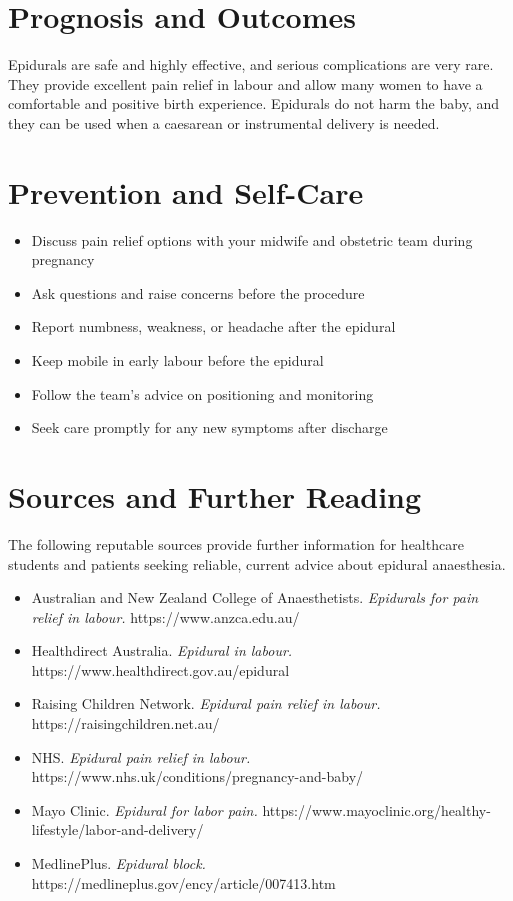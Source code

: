 \section*{Prognosis and Outcomes}
Epidurals are safe and highly effective, and serious complications are very rare. They provide excellent pain relief in labour and allow many women to have a comfortable and positive birth experience. Epidurals do not harm the baby, and they can be used when a caesarean or instrumental delivery is needed.

\section*{Prevention and Self-Care}
\begin{itemize}
    \item Discuss pain relief options with your midwife and obstetric team during pregnancy
    \item Ask questions and raise concerns before the procedure
    \item Report numbness, weakness, or headache after the epidural
    \item Keep mobile in early labour before the epidural
    \item Follow the team's advice on positioning and monitoring
    \item Seek care promptly for any new symptoms after discharge
\end{itemize}

\section*{Sources and Further Reading}
The following reputable sources provide further information for healthcare students and patients seeking reliable, current advice about epidural anaesthesia.
\begin{itemize}
    \item Australian and New Zealand College of Anaesthetists. \textit{Epidurals for pain relief in labour.} https://www.anzca.edu.au/
    \item Healthdirect Australia. \textit{Epidural in labour.} https://www.healthdirect.gov.au/epidural
    \item Raising Children Network. \textit{Epidural pain relief in labour.} https://raisingchildren.net.au/
    \item NHS. \textit{Epidural pain relief in labour.} https://www.nhs.uk/conditions/pregnancy-and-baby/
    \item Mayo Clinic. \textit{Epidural for labor pain.} https://www.mayoclinic.org/healthy-lifestyle/labor-and-delivery/
    \item MedlinePlus. \textit{Epidural block.} https://medlineplus.gov/ency/article/007413.htm
\end{itemize}
